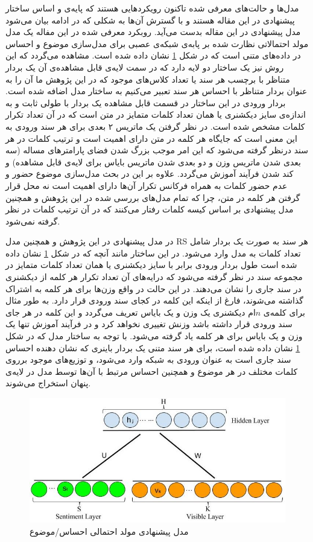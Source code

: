 \documentclass[12pt,a4paper]{article}
\begin{document}
مدل‌ها و حالت‌های معرفی شده تاکنون رویکردهایی هستند که پایه‌ی و اساس ساختار پیشنهادی در این مقاله هستند و با گسترش آن‌ها به شکلی که در ادامه بیان می‌شود مدل پیشنهادی در این مقاله بدست می‌آید. روبکرد معرفی‌ شده در این مفاله یک مدل مولد احتمالاتی نظارت شده 
بر پابه‌ی شبکه‌ی عصبی برای مدل‌سازی موضوع و احساس در داده‌های متنی است که در شکل
\ref{fig3}
نشان داده شده است. مشاهده می‌‌گردد که این روش نیز یک ساختار دو لایه دارد که در سمت لایه‌ی قابل مشاهده‌ی آن یک بردار متناظر با برچسب هر سند یا تعداد کلاس‌های موجود که در این پژوهش ما آن را به عنوان بردار متناظر با احساس هر سند تعبیر می‌کنیم به ساختار مدل اضافه شده است. بردار ورودی در این ساختار در قسمت قابل مشاهده یک بردار با طولی ثابت و به اندازه‌ی سایز دیکشنری یا همان تعداد کلمات متمایز در متن است که در آن تعداد تکرار کلمات مشخص شده است. در نظر گرفتن یک ماتریس ۲ بعدی برای هر سند ورودی به 
این معنی‌ است که جایگاه هر کلمه در متن دارای اهمیت است و ترتیب کلمات در هر سند درنظر گرفته می‌‌شود که این امر موجب بزرگ شدن فضای پارامتر‌های مساله (سه‌ بعدی شدن ماتریس وزن و دو بعدی شدن ماتریس بایاس برای لایه‌ی قابل مشاهده) و کند شدن فرآیند آموزش می‌‌گردد. علاوه بر این در بحث مدل‌سازی موضوع حضور و عدم حضور کلمات به همراه فرکانس تکرار آن‌ها دارای اهمیت است نه محل قرار گرفتن هر کلمه در متن، چرا که تمام مدل‌های بررسی‌ شده در این پژوهش و همچنین مدل پیشنهادی بر اساس کیسه کلمات رفتار می‌‌کنند که در آن ترتیب کلمات در نظر گرفته نمی‌‌شود.

در مدل پیشنهادی در این پژوهش و همچنین مدل
RS
هر سند به صورت یک بردار شامل تعداد کلمات به مدل وارد می‌‌شود. در این ساختار مانند آنچه که در شکل
\ref{fig3}
نشان داده شده است طول بردار ورودی برابر با سایز دیکشنری یا همان تعداد کلمات متمایز در مجموعه سند در نظر گرفته می‌‌شود که درایه‌های آن تعداد تکرار هر کلمه از دیکشنری در سند جاری را نشان می‌‌دهند. در این حالت در واقع وزن‌ها برای هر کلمه به اشتراک گذاشته می‌‌شوند، فارغ از اینکه این کلمه در کجای سند ورودی قرار دارد. به طور مثال برای کلمه‌ی‌
$n$ام 
دیکشنری یک وزن و یک بایاس تعریف می‌‌گردد و این کلمه در هر جای سند ورودی قرار داشته باشد وزنش تغییری نخواهد کرد و در فرآیند آموزش تنها یک وزن و یک بایاس برای هر کلمه یاد گرفته می‌‌شود. با توجه به ساختار مدل که در شکل
\ref{fig3}
نشان داده شده است، برای هر سند متنی یک بردار باینری که نشان دهنده احساس سند جاری است به عنوان ورودی به شبکه وارد می‌‌شود، و توزیع‌های موجود برروی کلمات مختلف در هر موضوع و همچنین احساس مرتبط با آن‌ها توسط مدل در لایه‌‌ی پنهان استخراج می‌‌شوند.

\begin{figure}[!t]
	\centering
	\includegraphics[scale=0.5]{images/SRS}
	\caption{مدل پیشنهادی مولد احتمالی احساس/موضوع}
	\label{fig3}
\end{figure}
	
\end{document}
